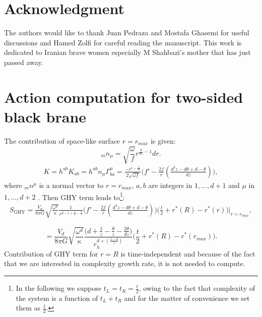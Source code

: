 \documentclass[]{article}
\begin{document}
\section*{Acknowledgment}
The authors would like to thank Juan Pedraza and Mostafa Ghasemi for useful discussions and Hamed Zolfi for careful reading the manuscript. This work is dedicated to Iranian brave women especially M Shahbazi's mother that has just passed away.
\appendix
\renewcommand\theequation{\thesection-\arabic{equation}} %
\setcounter{equation}{0}
\section{Action computation for two-sided black brane}\label{detail}

The contribution of space-like surface $r=r_{max}$ is given:
\begin{equation}
_mn_\mu=\sqrt{\frac{\omega}{f}}r^{\frac{\theta}{dz}-1}dr.
\end{equation}
\begin{align}
K=h^{ab}K_{ab}=h^{ab}n_{\mu}\Gamma^{\mu}_{ba}=\frac{-r^{1-\frac{\theta}{dz}}}{2\sqrt{\omega f}}\Big(f'-\frac{2f}{r}(\frac{d^2z-d\theta+d-\theta}{dz})\Big),
\end{align}
where $_mn^\mu$ is a normal vector to $r=r_{max}$, $a,b$ are integers in $1,... ,d+1$ and $\mu$ in$1,... ,d+2$ . Then GHY term leads to\footnote{In the following we suppose $t_L=t_R=\frac{t}{2}$, owing to the fact that complexity of the system is a function of $t_L+t_R$ and for the matter of convenience we set them as $\frac{t}{2}$. }:
\begin{align}
S_{\text{GHY}}=\frac{V_d}{8\pi G}\sqrt{\frac{\omega^{d}}{\kappa}}\frac{1}{r^{d-1+\frac{1}{z}-\frac{\theta}{z}}}\Big(f'-\frac{2f}{r}(\frac{d^2z-d\theta+d-\theta}{dz})\Big)\Big(\frac{t}{2}+r^*(R)-r^*(r)\Big)\Big|_{r=r_{max}},
\end{align}

\begin{equation}
=\frac{V_d}{8\pi G}\sqrt{\frac{\omega^{d}}{\kappa}}\frac{\Big(d+\frac{1}{z}-\frac{\theta}{z}-\frac{2\theta}{dz}\Big)}{r_h^{d+(\frac{1-\theta}{z})}}\Big(\frac{t}{2}+r^*(R)-r^*(r_{max})\Big). \label{ghy}
\end{equation}
Contribution of GHY term for $r=R$ is time-independent and because of the fact that we are interested in complexity growth rate, it is not needed to compute.
\end{document}
